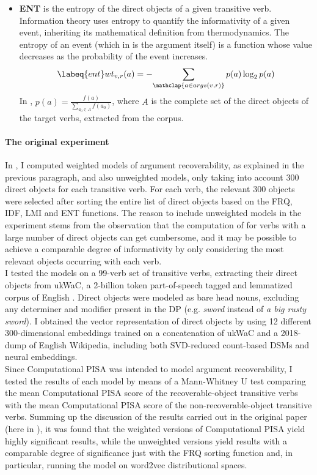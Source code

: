 \begin{itemize}
\item \textbf{ENT} is the entropy \parencite{shannon1948mathematical} of the direct objects of a given transitive verb. Information theory uses entropy to quantify the informativity of a given event, inheriting its mathematical definition from thermodynamics. The entropy of an event (which in  is the argument itself) is a function whose value decreases as the probability of the event increases.
 \begin{equation} \labeq{ent}
wt_{v,r}(a) = -\!\sum_{\mathclap{a \in args(v,r)}} p(a) \log _{2}p(a)
\end{equation}
In , $p(a) = \frac{f(a)}{\sum_{a_0 \in A}f(a_0)}$, where $A$ is the complete set of the direct objects of the target verbs, extracted from the corpus.
\end{itemize}

\paragraph{The original experiment}
In \textcite{CappelliLenciPISA}, I computed weighted models of argument recoverability, as explained in the previous paragraph, and also unweighted models, only taking into account 300 direct objects for each transitive verb. For each verb, the relevant 300 objects were selected after sorting the entire list of direct objects based on the FRQ, IDF, LMI and ENT functions. The reason to include unweighted models in the experiment stems from the observation that the computation of  for verbs with a large number of direct objects can get cumbersome, and it may be possible to achieve a comparable degree of informativity by only considering the most relevant objects occurring with each verb.\\
I tested the models on a 99-verb set of transitive verbs, extracting their direct objects from ukWaC, a 2-billion token part-of-speech tagged and lemmatized corpus of English \parencite{FerraresiEtAl2008}. Direct objects were modeled as bare head nouns, excluding any determiner and modifier present in the DP (e.g. \textit{sword} instead of \textit{a big rusty sword}). I obtained the vector representation of direct objects by using 12 different 300-dimensional embeddings trained on a concatenation of ukWaC and a 2018-dump of English Wikipedia, including both SVD-reduced count-based DSMs and neural embeddings.\\
Since Computational PISA was intended to model argument recoverability, I tested the results of each model by means of a Mann-Whitney U test comparing the mean Computational PISA score of the recoverable-object transitive verbs with the mean Computational PISA score of the non-recoverable-object transitive verbs. Summing up the discussion of the results carried out in the original paper (here in ), it was found that the weighted versions of Computational PISA yield highly significant results, while the unweighted versions yield results with a comparable degree of significance just with the FRQ sorting function and, in particular, running the model on word2vec \parencite{mikolov2013efficient} distributional spaces.

